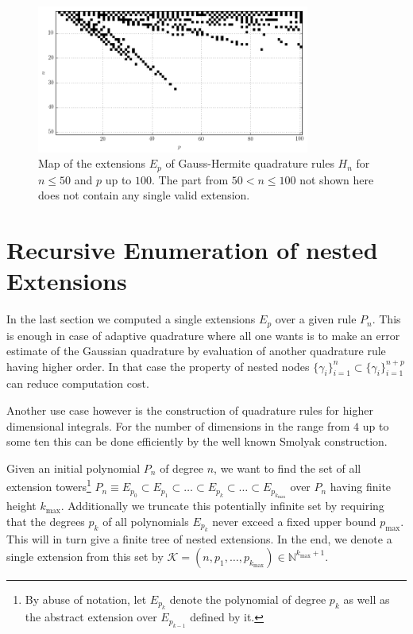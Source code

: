 \documentclass[a4paper,10pt]{article}
\begin{document}
\begin{figure}
  \centering
  \includegraphics[width=0.8\textwidth]{./img/map_herm_50_100.png}
  \caption{Map of the extensions $E_p$ of Gauss-Hermite quadrature rules
           $H_n$ for $n \leq 50$ and $p$ up to $100$. The part from
           $50 < n \leq 100$ not shown here does not contain any single
           valid extension.}
  \label{fig:map_herm_50_100}
\end{figure}


\FloatBarrier
\section{Recursive Enumeration of nested Extensions}


In the last section we computed a single extensions $E_p$ over a
given rule $P_n$. This is enough in case of adaptive quadrature where all one
wants is to make an error estimate of the Gaussian quadrature by evaluation
of another quadrature rule having higher order. In that case the property of
nested nodes $\{\gamma_i\}_{i=1}^n \subset \{\gamma_i\}_{i=1}^{n+p}$ can reduce
computation cost.

Another use case however is the construction of quadrature
rules for higher dimensional integrals. For the number of dimensions in the
range from $4$ up to some ten this can be done efficiently by the well known
Smolyak construction.


Given an initial polynomial $P_n$ of degree $n$, we want to find the set of all
extension towers\footnote{By abuse of notation, let $E_{p_k}$ denote the polynomial
of degree $p_k$ as well as the abstract extension over $E_{p_{k-1}}$ defined by it.}
$P_n \equiv E_{p_0} \subset E_{p_1} \subset \ldots \subset E_{p_k} \subset \ldots \subset E_{p_{k_{\textrm{max}}}}$
over $P_n$ having finite height $k_{\textrm{max}}$. Additionally we truncate this
potentially infinite set by requiring that the degrees $p_k$ of all polynomials $E_{p_k}$
never exceed a fixed upper bound $p_{\textrm{max}}$. This will in turn give a finite tree
of nested extensions. In the end, we denote a single extension from this set
by $\mathcal{K} = (n, p_1, \ldots, p_{k_{\textrm{max}}}) \in \mathbb{N}^{{k_{\textrm{max}}}+1}$.
\end{document}
